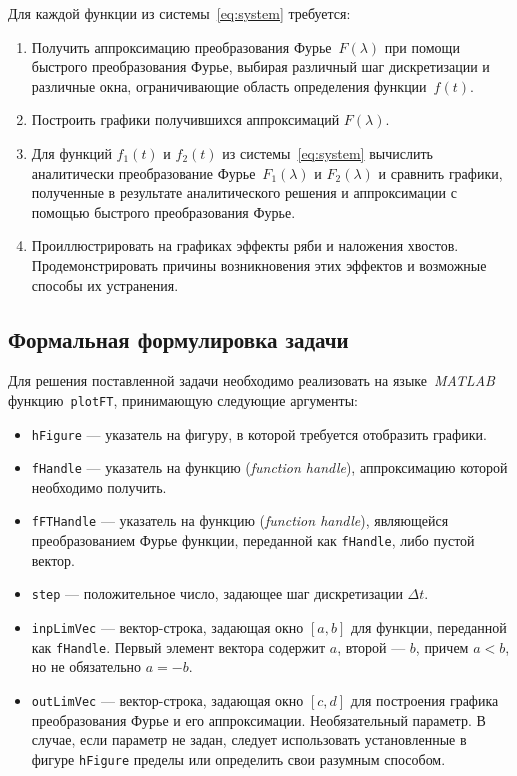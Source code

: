 \documentclass[a4paper, 11pt]{article}
\begin{document}
        Для каждой функции из системы~\eqref{eq:system} требуется:
        \begin{enumerate}
            \item Получить аппроксимацию преобразования Фурье~$F(\lambda)$ при помощи быстрого преобразования Фурье, выбирая различный шаг дискретизации и различные окна, ограничивающие область определения функции~$f(t)$.
            \item Построить графики получившихся аппроксимаций $F(\lambda)$.
            \item Для функций $f_1(t)$ и $f_2(t)$ из системы~\eqref{eq:system} вычислить аналитически преобразование Фурье~$F_1(\lambda)$ и $F_2(\lambda)$ и сравнить графики, полученные в результате аналитического решения и аппроксимации с помощью быстрого преобразования Фурье.
            \item Проиллюстрировать на графиках эффекты ряби и наложения хвостов. Продемонстрировать причины возникновения этих эффектов и возможные способы их устранения.
        \end{enumerate}
        
    \subsection{Формальная формулировка задачи}
        Для решения поставленной задачи необходимо реализовать на языке~\textit{MATLAB} функцию~\texttt{plotFT}, принимающую следующие аргументы:
        \begin{itemize}
            \item \texttt{hFigure} --- указатель на фигуру, в которой требуется отобразить графики.
            \item \texttt{fHandle} --- указатель на функцию (\textit{function handle}), аппроксимацию которой необходимо получить.
            \item \texttt{fFTHandle} --- указатель на функцию (\textit{function handle}), являющейся преобразованием Фурье функции, переданной как \texttt{fHandle}, либо пустой вектор.
            \item \texttt{step} --- положительное число, задающее шаг дискретизации $\Delta t$.
            \item \texttt{inpLimVec} --- вектор-строка, задающая окно $[a, b]$ для функции, переданной как \texttt{fHandle}. Первый элемент вектора содержит $a$, второй --- $b$, причем $a < b$, но не обязательно $a = -b$.
            \item \texttt{outLimVec} --- вектор-строка, задающая окно $[c, d]$ для построения графика преобразования Фурье и его аппроксимации. Необязательный параметр. В случае, если параметр не задан, следует использовать установленные в фигуре \texttt{hFigure} пределы или определить свои разумным способом.
        \end{itemize}
        
\end{document}
